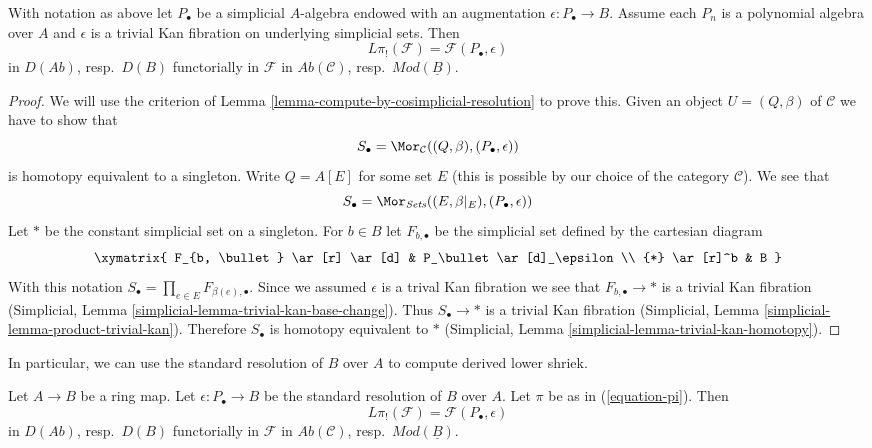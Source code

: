 \begin{lemma}
\label{lemma-identify-pi-shriek}
With notation as above let $P_\bullet$ be a simplicial $A$-algebra
endowed with an augmentation $\epsilon : P_\bullet \to B$.
Assume each $P_n$ is a polynomial algebra over $A$ and $\epsilon$
is a trivial Kan fibration on underlying simplicial sets. Then
$$
L\pi_!(\mathcal{F}) = \mathcal{F}(P_\bullet, \epsilon)
$$
in $D(\textit{Ab})$, resp.\ $D(B)$ functorially in $\mathcal{F}$ in
$\textit{Ab}(\mathcal{C})$, resp.\ $\textit{Mod}(\underline{B})$.
\end{lemma}

\begin{proof}
We will use the criterion of
Lemma \ref{lemma-compute-by-cosimplicial-resolution} to prove this.
Given an object $U = (Q, \beta)$ of $\mathcal{C}$ we have to show that
$$
S_\bullet = \Mor_\mathcal{C}((Q, \beta), (P_\bullet, \epsilon))
$$
is homotopy equivalent to a singleton.
Write $Q = A[E]$ for some set $E$ (this is possible by our choice of
the category $\mathcal{C}$). We see that
$$
S_\bullet = \Mor_{\textit{Sets}}((E, \beta|_E), (P_\bullet, \epsilon))
$$
Let $*$ be the constant simplicial set on a singleton. For $b \in B$
let $F_{b, \bullet}$ be the simplicial set defined by the cartesian
diagram
$$
\xymatrix{
F_{b, \bullet} \ar[r] \ar[d] & P_\bullet \ar[d]_\epsilon \\
{*} \ar[r]^b & B
}
$$
With this notation $S_\bullet = \prod_{e \in E} F_{\beta(e), \bullet}$.
Since we assumed $\epsilon$ is a trival Kan fibration we see that
$F_{b, \bullet} \to *$ is a trivial Kan fibration
(Simplicial, Lemma \ref{simplicial-lemma-trivial-kan-base-change}).
Thus $S_\bullet \to *$ is a trivial Kan fibration
(Simplicial, Lemma \ref{simplicial-lemma-product-trivial-kan}).
Therefore $S_\bullet$ is homotopy equivalent to $*$
(Simplicial, Lemma \ref{simplicial-lemma-trivial-kan-homotopy}).
\end{proof}

\noindent
In particular, we can use the standard resolution of $B$ over $A$
to compute derived lower shriek.

\begin{lemma}
\label{lemma-pi-shriek-standard}
Let $A \to B$ be a ring map. Let $\epsilon : P_\bullet \to B$
be the standard resolution of $B$ over $A$. Let $\pi$ be as in
(\ref{equation-pi}). Then
$$
L\pi_!(\mathcal{F}) = \mathcal{F}(P_\bullet, \epsilon)
$$
in $D(\textit{Ab})$, resp.\ $D(B)$ functorially in $\mathcal{F}$ in
$\textit{Ab}(\mathcal{C})$, resp.\ $\textit{Mod}(\underline{B})$.
\end{lemma}


